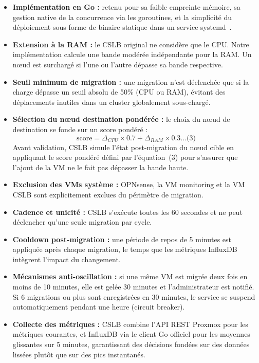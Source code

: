 \begin{itemize}
    \item \textbf{Implémentation en Go :} retenu pour sa faible empreinte mémoire, sa gestion native de la concurrence via les goroutines, et la simplicité du déploiement sous forme de binaire statique dans un service systemd~\cite{ref14}.

    \item \textbf{Extension à la RAM :} le CSLB original ne considère que le CPU. Notre implémentation calcule une bande modérée indépendante pour la RAM. Un nœud est surchargé si l'une ou l'autre dépasse sa bande respective.

    \item \textbf{Seuil minimum de migration :} une migration n'est déclenchée que si la charge dépasse un seuil absolu de 50\% (CPU ou RAM), évitant des déplacements inutiles dans un cluster globalement sous-chargé.

    \item \textbf{Sélection du nœud destination pondérée :} le choix du nœud de destination se fonde sur un score pondéré :
    \[
    \text{score} = \Delta_{CPU} \times 0.7 + \Delta_{RAM} \times 0.3 \text{...(3)}
    \]
    Avant validation, CSLB simule l'état post-migration du nœud cible en appliquant le score pondéré défini par l'équation~(3) pour s'assurer que l'ajout de la VM ne le fait pas dépasser la bande haute.


    \item \textbf{Exclusion des VMs système :} OPNsense, la VM monitoring et la VM CSLB sont explicitement exclues du périmètre de migration.

    \item \textbf{Cadence et unicité :} CSLB s'exécute toutes les 60 secondes et ne peut déclencher qu'une seule migration par cycle.

    \item \textbf{Cooldown post-migration :} une période de repos de 5 minutes est appliquée après chaque migration, le temps que les métriques InfluxDB intègrent l'impact du changement.

    \item \textbf{Mécanismes anti-oscillation :} si une même VM est migrée deux fois en moins de 10 minutes, elle est gelée 30 minutes et l'administrateur est notifié. Si 6 migrations ou plus sont enregistrées en 30 minutes, le service se suspend automatiquement pendant une heure (circuit breaker).

    \item \textbf{Collecte des métriques :} CSLB combine l'API REST Proxmox pour les métriques courantes, et InfluxDB via le client Go officiel pour les moyennes glissantes sur 5 minutes, garantissant des décisions fondées sur des données lissées plutôt que sur des pics instantanés.
\end{itemize}

